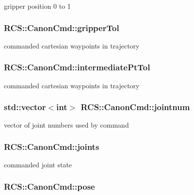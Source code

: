 gripper position 0 to 1 \hypertarget{structRCS_1_1CanonCmd_af76b1a60d2d7282d1a60863c907176de}{
\subsubsection[{gripper\-Tol}]{ R\-C\-S\-::\-Canon\-Cmd\-::gripper\-Tol}}\label{structRCS_1_1CanonCmd_af76b1a60d2d7282d1a60863c907176de}
commanded cartesian waypoints in trajectory \hypertarget{structRCS_1_1CanonCmd_a9b27fcbd1298ee6a95e412a68741ddfc}{
\subsubsection[{intermediate\-Pt\-Tol}]{ R\-C\-S\-::\-Canon\-Cmd\-::intermediate\-Pt\-Tol}}\label{structRCS_1_1CanonCmd_a9b27fcbd1298ee6a95e412a68741ddfc}
commanded cartesian waypoints in trajectory \hypertarget{structRCS_1_1CanonCmd_a1fb8395cab4ebddddafd37e7387f9ff8}{
\subsubsection[{jointnum}]{\setlength{\rightskip}{0pt plus 5cm}std\-::vector$<$int$>$ R\-C\-S\-::\-Canon\-Cmd\-::jointnum}}\label{structRCS_1_1CanonCmd_a1fb8395cab4ebddddafd37e7387f9ff8}
vector of joint numbers used by command \hypertarget{structRCS_1_1CanonCmd_aca799c5c818f28f0d9f4797b325b03de}{
\subsubsection[{joints}]{ R\-C\-S\-::\-Canon\-Cmd\-::joints}}\label{structRCS_1_1CanonCmd_aca799c5c818f28f0d9f4797b325b03de}
commanded joint state \hypertarget{structRCS_1_1CanonCmd_adc27ad3ae01d7aab1c9c92f08df82fc1}{
\subsubsection[{pose}]{ R\-C\-S\-::\-Canon\-Cmd\-::pose}}\label{structRCS_1_1CanonCmd_adc27ad3ae01d7aab1c9c92f08df82fc1}
